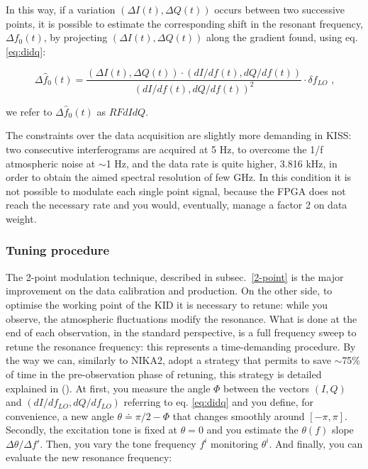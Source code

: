 \documentclass[twocolumn,traditabstract]{aa}\\
\begin{document}
\noindent In this way, if a variation $(\Delta I(t), \Delta Q(t))$ occurs between two successive points, it is possible to estimate the corresponding shift in the resonant frequency, $\Delta f_0(t)$, by projecting
$(\Delta I(t), \Delta Q(t))$ along the gradient found, using 
eq. \ref{eq:didq}:

\begin{equation}
\Delta \hat{f}_0 (t) = \frac{(\Delta I(t), \Delta Q(t))\cdot (dI/df(t),dQ/df(t)  ) }{ ( dI/df(t), dQ/df(t) )^2 }\cdot\delta f_{LO} \text{ ,}
\end{equation}

\noindent we refer to $\Delta \hat{f}_0 (t)$ as $RFdIdQ$.

The constraints over the data acquisition are slightly more demanding in KISS: two consecutive interferograms are acquired at 5 Hz, to overcome the 1/f atmospheric noise at $\sim$1 Hz, and the data rate is quite higher, 3.816 kHz, in order to obtain the aimed spectral resolution of few GHz. In this condition it is not possible to modulate each single point signal, because the FPGA does not reach the necessary rate and you would, eventually, manage a factor 2 on data weight.

\subsubsection{Tuning procedure}
\label{sec:tuning}

The 2-point modulation technique, described in subsec.~\ref{2-point} is the major improvement on the data calibration and production. On the other side, to optimise the working point of the KID it is necessary to retune: while you observe, the atmospheric fluctuations modify the resonance. What is done at the end of each observation, in the standard perspective, is a full frequency sweep to retune the resonance frequency: this represents a time-demanding procedure. By the way we can, similarly to NIKA2, adopt a strategy that permits to save $\sim$75\% of time in the pre-observation phase of retuning, this strategy is detailed explained in (\cite{2014SPIE.9153E..02C}). At first, you measure the angle $\Phi$ between the vectors $(I,Q)$ and $(dI/df_{LO},dQ/df_{LO})$ referring to eq. \ref{eq:didq} and you define, for convenience, a new angle $\theta\doteq \pi/2-\Phi$ that changes smoothly around $[-\pi,\pi]$. Secondly, the excitation tone is fixed at $\theta=0$ and you estimate the $\theta(f)$ slope $\Delta\theta/\Delta f'$. Then, you vary the tone frequency $f^i$ monitoring $\theta^i$. And finally, you can evaluate the new resonance frequency:
\end{document}
